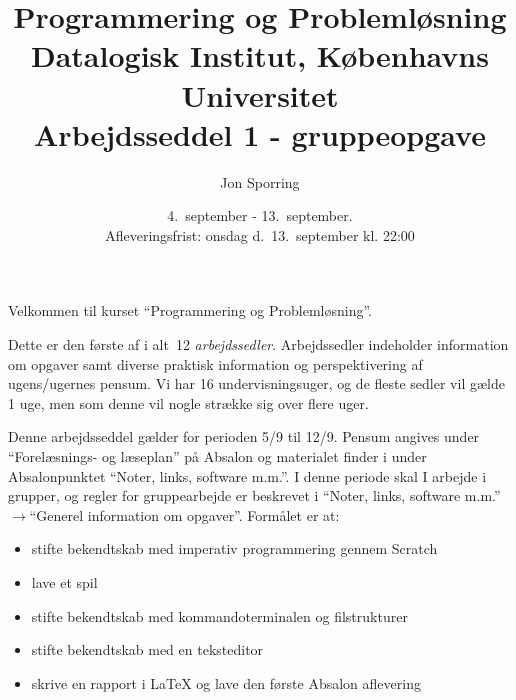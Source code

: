 \documentclass[a4paper,12pt]{article}
\title{Programmering og Problemløsning\\Datalogisk Institut,
  Københavns Universitet\\Arbejdsseddel 1 - gruppeopgave}
\author{Jon Sporring}
\date{4.\ september - 13.\ september.\\Afleveringsfrist: onsdag d.\ 13.\ september kl. 22:00}
\begin{document}
\maketitle

Velkommen til kurset ``Programmering og Problemløsning''.

Dette er den første af i alt~12 \emph{arbejdssedler}. Arbejdssedler indeholder information om opgaver samt diverse praktisk information og perspektivering af ugens/ugernes pensum. Vi har 16 undervisningsuger, og de fleste sedler vil gælde 1 uge, men som denne vil nogle strække sig over flere uger.

Denne arbejdsseddel gælder for perioden 5/9 til 12/9. Pensum angives under "`Forelæsnings- og læseplan"' på Absalon og materialet finder i under Absalonpunktet "`Noter, links, software m.m."'.  I denne periode skal I arbejde i grupper, og regler for gruppearbejde er beskrevet i "`Noter, links, software m.m."'$\rightarrow$"`Generel information om opgaver"'. Formålet er at:
\begin{itemize}
\item stifte bekendtskab med imperativ programmering gennem Scratch
\item lave et spil
\item stifte bekendtskab med kommandoterminalen og filstrukturer
\item stifte bekendtskab med en teksteditor
\item skrive en rapport i LaTeX og lave den første Absalon aflevering
\end{itemize}
\end{document}
